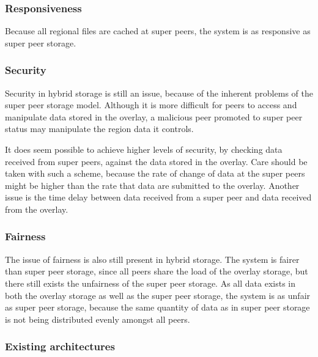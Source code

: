 \subsubsection{Responsiveness}

Because all regional files are cached at super peers, the system is as responsive as super peer storage.

\subsubsection{Security}

Security in hybrid storage is still an issue, because of the inherent problems of the super peer storage model. Although it is more difficult for peers to access and manipulate data stored in the overlay, a malicious peer promoted to super peer status may manipulate the region data it controls.

It does seem possible to achieve higher levels of security, by checking data received from super peers, against the data stored in the overlay. Care should be taken with such a scheme, because the rate of change of data at the super peers might be higher than the rate that data are submitted to the overlay. Another issue is the time delay between data received from a super peer and data received from the overlay.

\subsubsection{Fairness}

The issue of fairness is also still present in hybrid storage. The system is fairer than super peer storage, since all peers share the load of the overlay storage, but there still exists the unfairness of the super peer storage. As all data exists in both the overlay storage as well as the super peer storage, the system is as unfair as super peer storage, because the same quantity of data as in super peer storage is not being distributed evenly amongst all peers.

\subsubsection{Existing architectures}

